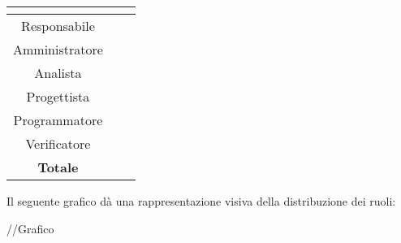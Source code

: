 \begin{center}
\renewcommand{\arraystretch}{1.5}
\begin{tabular}{|c|c|c|}
\hline
\rowcolor{title_row}
\textbf{\color{title_text}{Ruolo}}  & \textbf{\color{title_text}{Ore}} & \textbf{\color{title_text}{Costo in \euro}} \\ \hline
Responsabile    &              &                     \\ \hline
Amministratore  &              &                     \\ \hline
Analista        &              &                     \\ \hline
Progettista     &              &                     \\ \hline
Programmatore   &              &                     \\ \hline
Verificatore    &              &                     \\ \hline
\textbf{Totale} & \textbf{}    & \textbf{}           \\ \hline
\end{tabular}
\renewcommand{\arraystretch}{1}
\end{center}

Il seguente grafico dà una rappresentazione visiva della distribuzione dei ruoli: \\
\begin{center}
//Grafico
\end{center}

\pagebreak
